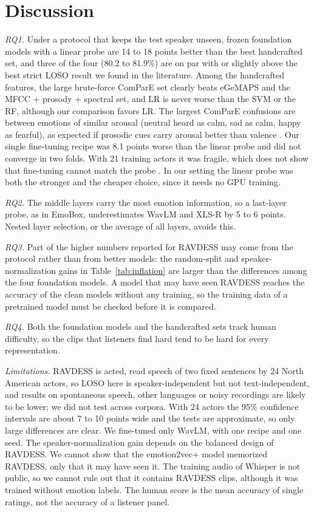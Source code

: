 \documentclass[journal]{IEEEtran}
\begin{document}
\section{Discussion}
\label{sec:discussion}
\emph{RQ1.} Under a protocol that keeps the test speaker unseen, frozen foundation models with a linear probe are 14 to 18 points better than the best handcrafted set, and three of the four (80.2 to 81.9\%) are on par with or slightly above the best strict LOSO result we found in the literature. Among the handcrafted features, the large brute-force ComParE set clearly beats eGeMAPS and the MFCC + prosody + spectral set, and LR is never worse than the SVM or the RF, although our comparison favors LR. The largest ComParE confusions are between emotions of similar arousal (neutral heard as calm, sad as calm, happy as fearful), as expected if prosodic cues carry arousal better than valence \cite{elayadi2011survey}. Our single fine-tuning recipe was 8.1 points worse than the linear probe and did not converge in two folds. With 21 training actors it was fragile, which does not show that fine-tuning cannot match the probe \cite{wagner2023dawn,lunajimenez2022proposal}. In our setting the linear probe was both the stronger and the cheaper choice, since it needs no GPU training.

\emph{RQ2.} The middle layers carry the most emotion information, so a last-layer probe, as in EmoBox, underestimates WavLM and XLS-R by 5 to 6 points. Nested layer selection, or the average of all layers, avoids this.

\emph{RQ3.} Part of the higher numbers reported for RAVDESS may come from the protocol rather than from better models: the random-split and speaker-normalization gains in Table~\ref{tab:inflation} are larger than the differences among the four foundation models. A model that may have seen RAVDESS reaches the accuracy of the clean models without any training, so the training data of a pretrained model must be checked before it is compared.

\emph{RQ4.} Both the foundation models and the handcrafted sets track human difficulty, so the clips that listeners find hard tend to be hard for every representation.

\emph{Limitations.} RAVDESS is acted, read speech of two fixed sentences by 24 North American actors, so LOSO here is speaker-independent but not text-independent, and results on spontaneous speech, other languages or noisy recordings are likely to be lower; we did not test across corpora. With 24 actors the 95\% confidence intervals are about 7 to 10 points wide and the tests are approximate, so only large differences are clear. We fine-tuned only WavLM, with one recipe and one seed. The speaker-normalization gain depends on the balanced design of RAVDESS. We cannot show that the emotion2vec+ model memorized RAVDESS, only that it may have seen it. The training audio of Whisper is not public, so we cannot rule out that it contains RAVDESS clips, although it was trained without emotion labels. The human score is the mean accuracy of single ratings, not the accuracy of a listener panel.
\end{document}
